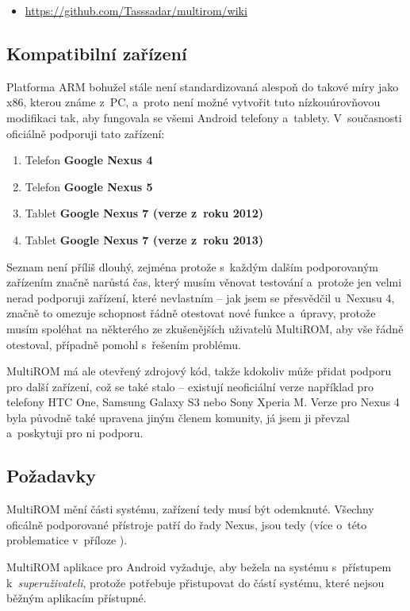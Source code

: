 \documentclass[12pt, a4paper, oneside]{article}
\newcommand{\B}{\textbf} %
\newcommand{\It}{\textit}  %
\begin{document}
\begin{itemize}
\item \url{https://github.com/Tasssadar/multirom/wiki}
\end{itemize}

\subsection{Kompatibilní zařízení}
Platforma ARM bohužel stále není standardizovaná alespoň do takové míry jako x86, kterou známe z~PC, a~proto není možné vytvořit tuto nízkouúrovňovou modifikaci tak, aby fungovala se všemi Android telefony a~tablety. V~současnosti oficiálně podporuji tato zařízení:

\begin{enumerate}
    \item Telefon \B{Google Nexus 4}
    \item Telefon \B{Google Nexus 5}
    \item Tablet \B{Google Nexus 7 (verze z~roku 2012)}
    \item Tablet \B{Google Nexus 7 (verze z~roku 2013)}
\end{enumerate}

Seznam není příliš dlouhý, zejména protože s~každým dalším podporovaným zařízením značně narůstá čas, který musím věnovat testování a~protože jen velmi nerad podporuji zařízení, které nevlastním -- jak jsem se přesvědčil u~Nexusu 4, značně to omezuje schopnost řádně otestovat nové funkce a~úpravy, protože musím spoléhat na některého ze zkušenějších uživatelů MultiROM, aby vše řádně otestoval, případně pomohl s~řešením problému.

MultiROM má ale otevřený zdrojový kód, takže kdokoliv může přidat podporu pro další zařízení, což se také stalo -- existují neoficiální verze například pro telefony HTC One, Samsung Galaxy S3 nebo Sony Xperia M. Verze pro Nexus 4 byla původně také upravena jiným členem komunity, já jsem ji převzal a~poskytuji pro ni podporu.

\subsection{Požadavky}
MultiROM mění části systému, zařízení tedy musí být odemknuté. Všechny oficálně podporované přístroje patří do řady Nexus, jsou tedy  (více o~této problematice v~příloze ).

MultiROM aplikace pro Android vyžaduje, aby bežela na systému s~přístupem k~\It{superuživateli}, protože potřebuje přistupovat do částí systému, které nejsou běžným aplikacím přístupné.
\end{document}
